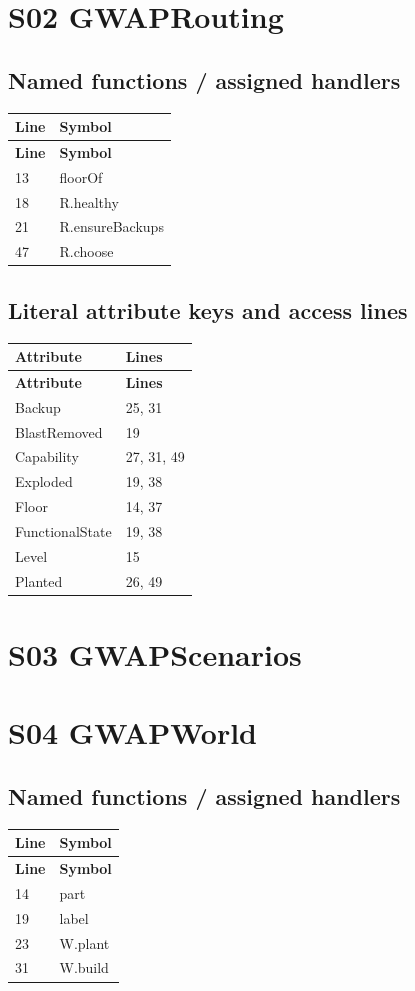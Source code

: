 \section{S02 GWAPRouting}
\subsection{Named functions /\allowbreak{} assigned handlers}
\begin{longtable}{p{}p{}}
\toprule
\textbf{Line} & \textbf{Symbol} \\ \midrule
\endfirsthead
\textbf{Line} & \textbf{Symbol} \\ \midrule
\endhead
13 & floorOf \\
18 & R.\allowbreak{}healthy \\
21 & R.\allowbreak{}ensureBackups \\
47 & R.\allowbreak{}choose \\
\bottomrule
\end{longtable}
\subsection{Literal attribute keys and access lines}
\begin{longtable}{p{}p{}}
\toprule
\textbf{Attribute} & \textbf{Lines} \\ \midrule
\endfirsthead
\textbf{Attribute} & \textbf{Lines} \\ \midrule
\endhead
Backup & 25, 31 \\
BlastRemoved & 19 \\
Capability & 27, 31, 49 \\
Exploded & 19, 38 \\
Floor & 14, 37 \\
FunctionalState & 19, 38 \\
Level & 15 \\
Planted & 26, 49 \\
\bottomrule
\end{longtable}
\section{S03 GWAPScenarios}
\section{S04 GWAPWorld}
\subsection{Named functions /\allowbreak{} assigned handlers}
\begin{longtable}{p{}p{}}
\toprule
\textbf{Line} & \textbf{Symbol} \\ \midrule
\endfirsthead
\textbf{Line} & \textbf{Symbol} \\ \midrule
\endhead
14 & part \\
19 & label \\
23 & W.\allowbreak{}plant \\
31 & W.\allowbreak{}build \\
\bottomrule
\end{longtable}
